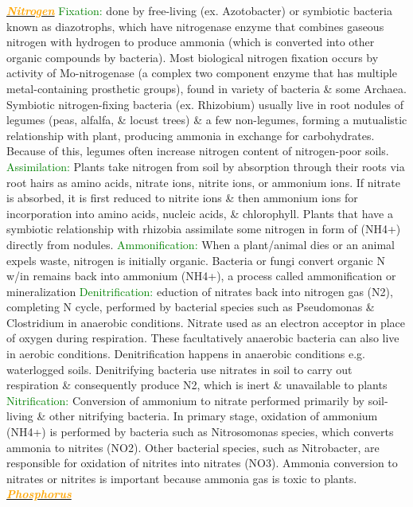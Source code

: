 \documentclass{article}
\newcommand{\green}[1]{\textcolor{green}{#1}}
\newcommand{\orange}[1]{\textcolor{orange}{#1}}
\newcommand{\mysubsection}[1]{\underline{\textbf{{\textit{\orange{#1}}}}}}
\newcommand{\mysubsub}[1]{{{\green{#1}}}}
\begin{document}
\begin{multicols*}{4}
		\mysubsection{Nitrogen}
			\mysubsub{Fixation: } 
				done by free-living (ex. Azotobacter) or symbiotic bacteria known as diazotrophs, which have nitrogenase enzyme that combines gaseous nitrogen with hydrogen to produce ammonia (which is converted into other organic compounds by bacteria). Most biological nitrogen fixation occurs by activity of Mo-nitrogenase (a complex two component enzyme that has multiple metal-containing prosthetic groups), found in variety of bacteria \& some Archaea. Symbiotic nitrogen-fixing bacteria (ex. Rhizobium) usually live in root nodules of legumes (peas, alfalfa, \& locust trees) \& a few non-legumes, forming a mutualistic relationship with plant, producing ammonia in exchange for carbohydrates. Because of this, legumes often increase nitrogen content of nitrogen-poor soils.
			\mysubsub{Assimilation: }
				Plants take nitrogen from soil by absorption through their roots via root hairs as amino acids, nitrate ions, nitrite ions, or ammonium ions. If nitrate is absorbed, it is first reduced to nitrite ions \& then ammonium ions for incorporation into amino acids, nucleic acids, \& chlorophyll. Plants that have a symbiotic relationship with rhizobia assimilate some nitrogen in form of (NH4+) directly from nodules.
			\mysubsub{Ammonification: }
				When a plant/animal dies or an animal expels waste, nitrogen is initially organic. Bacteria or fungi convert organic N w/in remains back into ammonium (NH4+), a process called ammonification or mineralization
			\mysubsub{Denitrification: }
				eduction of nitrates back into nitrogen gas (N2), completing N cycle, performed by bacterial species such as Pseudomonas \& Clostridium in anaerobic conditions. Nitrate used as an electron acceptor in place of oxygen during respiration. These facultatively anaerobic bacteria can also live in aerobic conditions. Denitrification happens in anaerobic conditions e.g. waterlogged soils. Denitrifying bacteria use nitrates in soil to carry out respiration \& consequently produce N2, which is inert \& unavailable to plants 
			\mysubsub{Nitrification: } 
				Conversion of ammonium to nitrate performed primarily by soil-living \& other nitrifying bacteria. In primary stage, oxidation of ammonium (NH4+) is performed by bacteria such as Nitrosomonas species, which converts ammonia to nitrites (NO2). Other bacterial species, such as Nitrobacter, are responsible for oxidation of nitrites into nitrates (NO3). Ammonia conversion to nitrates or nitrites is important because ammonia gas is toxic to plants.
		\mysubsection{Phosphorus}

\end{multicols*}
\end{document}

